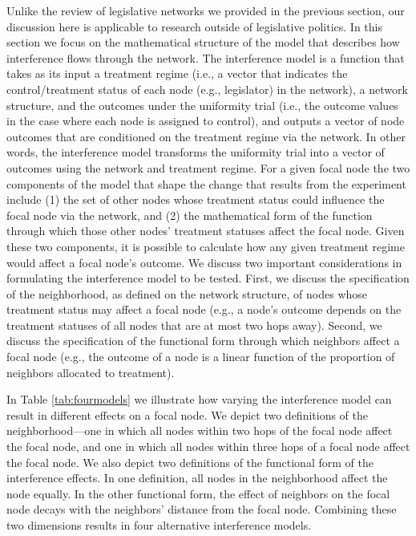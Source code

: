 \documentclass[12pt]{article}
\begin{document}
Unlike the review of legislative networks we provided in the previous section, our discussion here is applicable to research outside of legislative politics. In this section we focus on the mathematical structure of the model that describes how interference flows through the network. The interference model is a function that takes as its input a treatment regime (i.e., a vector that indicates the control/treatment status of each node (e.g., legislator) in the network), a network structure, and the outcomes under the uniformity trial (i.e., the outcome values in the case where each node is assigned to control), and outputs a vector of node outcomes that are conditioned on the treatment regime via the network. In other words, the interference model transforms the uniformity trial into a vector of outcomes using the network and treatment regime. For a given focal node the two components of the model that shape the change that results from the experiment include (1) the set of other nodes whose treatment status could influence the focal node via the network, and (2) the mathematical form of the function through which those other nodes' treatment statuses affect the focal node. Given these two components, it is possible to calculate how any given treatment regime would affect a focal node's outcome. We discuss two important considerations in formulating the interference model to be tested. First, we discuss the specification of the neighborhood, as defined on the network structure, of nodes whose treatment status may affect a focal node (e.g., a node's outcome depends on the treatment statuses of all nodes that are at most two hops away). Second, we discuss the specification of the functional form through which neighbors affect a focal node (e.g., the outcome of a node is a linear function of the proportion of neighbors allocated to treatment).

In Table \ref{tab:fourmodels} we illustrate how varying the interference model can result in different effects on a focal node. We depict two definitions of the neighborhood---one in which all nodes within two hops of the focal node affect the focal node, and one in which all nodes within three hops of a focal node affect the focal node. We also depict two definitions of the functional form of the interference effects. In one definition, all nodes in the neighborhood affect the node equally. In the other functional form, the effect of neighbors on the focal node decays with the neighbors' distance from the focal node. Combining these two dimensions results in four alternative interference models. 
\end{document}
